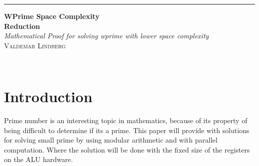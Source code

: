 \documentclass[12pt, oneside, onecolumn]{article}
\begin{document}
\begin{titlepage} %
	
	\raggedleft %
	
	\rule{1pt}{\textheight} %
	\hspace{0.05\textwidth} %
	\parbox[b]{0.75\textwidth}{ %
		
		{\Huge\bfseries WPrime Space Complexity\\  Reduction}\\[2\baselineskip] %
		{\large\textit{Mathematical Proof for solving wprime with lower space complexity}}\\[4\baselineskip] %
		{\Large\textsc{Valdemar Lindberg}} %
		
		\vspace{0.5\textheight} %
		
		{\noindent }\\[\baselineskip] %
	}

\end{titlepage}

\newpage
{} %

\tableofcontents
\newpage
{} %

% 
\section{Introduction}
Prime number is an interesting topic in mathematics, because of its property of being difficult to determine if its a prime. This paper will provide with solutions for solving small prime by using modular arithmetic and with parallel computation. Where the solution will be done with the fixed size of the registers on the ALU hardware.
\end{document}
